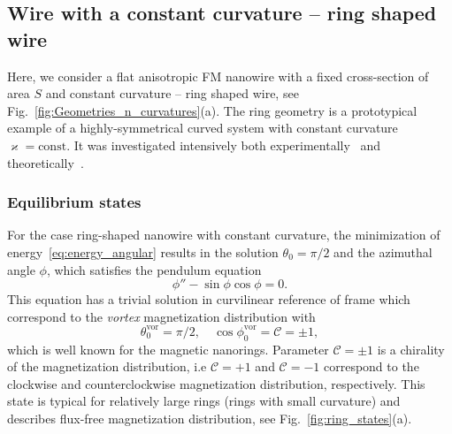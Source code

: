 \subsection{Wire with a constant curvature -- ring shaped wire}\label{sec:rings}

Here, we consider a flat anisotropic FM nanowire with a fixed cross-section of area $S$ and constant curvature -- ring shaped wire, see Fig.~\ref{fig:Geometries_n_curvatures}(a). The ring geometry is a prototypical example of a highly-symmetrical curved system with constant curvature $\varkappa=\text{const}$. It was investigated intensively both experimentally~\cite{Klaui01,Klaui03a,Klaui05a} and theoretically~\cite{Kravchuk09,Kravchuk11,Sheka15}.%

\subsubsection{Equilibrium states}\label{sec:rings_equilibrium}

For the case ring-shaped nanowire with constant curvature, the minimization of energy~\eqref{eq:energy_angular} results in the solution $\theta_0=\pi/2$ and the azimuthal angle $\phi$, which
satisfies the pendulum equation
\begin{equation}\label{eq:ring_phi}
\phi'' - \sin\phi\cos\phi = 0.
\end{equation}
This equation has a trivial solution in curvilinear reference of frame which correspond to the \textit{vortex} magnetization distribution with
\begin{equation}\label{eq:ring_vortex}
\theta_0^\text{vor}=\pi/2,\quad \cos\phi_0^\text{vor} = \mathcal{C}=\pm 1,
\end{equation}
which is well known for the magnetic nanorings. Parameter $\mathcal{C}=\pm1$ is a chirality of the magnetization distribution, i.e $\mathcal{C}=+1$ and $\mathcal{C}=-1$ correspond to the clockwise and counterclockwise magnetization distribution, respectively. This state is typical for relatively large rings (rings with small curvature) and describes flux-free magnetization distribution, see Fig.~\ref{fig:ring_states}(a).

